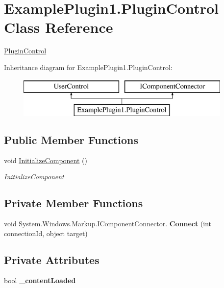 \hypertarget{class_example_plugin1_1_1_plugin_control}{}\section{Example\+Plugin1.\+Plugin\+Control Class Reference}
\label{class_example_plugin1_1_1_plugin_control}


\mbox{\hyperlink{class_example_plugin1_1_1_plugin_control}{Plugin\+Control}}  


Inheritance diagram for Example\+Plugin1.\+Plugin\+Control\+:\begin{figure}[H]
\begin{center}
\leavevmode
\includegraphics[height=2.000000cm]{db/d3b/class_example_plugin1_1_1_plugin_control}
\end{center}
\end{figure}
\subsection*{Public Member Functions}
\begin{DoxyCompactItemize}
\item 
void \mbox{\hyperlink{class_example_plugin1_1_1_plugin_control_a8bbee8bd8cafb6b0106fa9de76811725}{Initialize\+Component}} ()
\begin{DoxyCompactList}\small\item\em Initialize\+Component \end{DoxyCompactList}\end{DoxyCompactItemize}
\subsection*{Private Member Functions}
\begin{DoxyCompactItemize}
\item 
\mbox{\label{class_example_plugin1_1_1_plugin_control_a7fc8de54fcea5cd81c48332b3bb2e4f2}} 
void System.\+Windows.\+Markup.\+I\+Component\+Connector. {\bfseries Connect} (int connection\+Id, object target)
\end{DoxyCompactItemize}
\subsection*{Private Attributes}
\begin{DoxyCompactItemize}
\item 
\mbox{\label{class_example_plugin1_1_1_plugin_control_aec96921ec82624eee1f2c32c846444b2}} 
bool {\bfseries \+\_\+content\+Loaded}
\end{DoxyCompactItemize}


